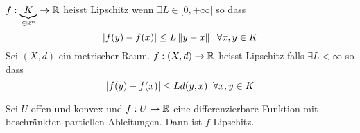 \begin{Def}
  $f:\underbrace{K}_{\in \mathbb{R}^n}\rightarrow\mathbb{R}$ heisst Lipschitz wenn $\exists L\in [0,+\infty[$ so dass
  \[\left| f(y)-f(x) \right|\leq L\left\| y-x \right\|\hspace{2mm}\forall x,y\in K\]
Sei $(X,d)$ ein metrischer Raum. $f:(X,d)\rightarrow\mathbb{R}$ heisst Lipschitz falls $\exists L<\infty$ so dass
  \[\left| f(y)-f(x) \right|\leq L d(y, x)\hspace{2mm}\forall x,y\in K\]
\end{Def}

\begin{Kor}
Sei $U$ offen und konvex und $f:U\rightarrow \mathbb{R}$ eine differenzierbare Funktion mit beschr\"ankten
partiellen Ableitungen. Dann ist $f$ Lipschitz.
\end{Kor}
